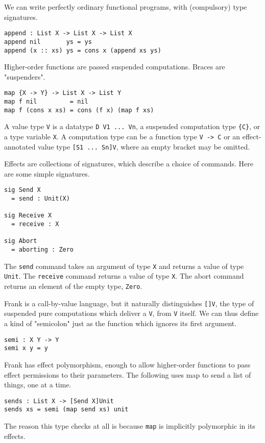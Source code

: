 \documentclass[preprint]{sigplanconf}
\begin{document}
We can write perfectly ordinary functional programs, with (compulsory)
type signatures.
%
\begin{verbatim}
append : List X -> List X -> List X
append nil       ys = ys
append (x :: xs) ys = cons x (append xs ys)
\end{verbatim}

Higher-order functions are passed suspended computations. Braces are
"suspenders".
%
\begin{verbatim}
map {X -> Y} -> List X -> List Y
map f nil         = nil
map f (cons x xs) = cons (f x) (map f xs)
\end{verbatim}

A value type \verb!V! is a datatype \verb!D V1 ... Vn!, a suspended
computation type \verb!{C}!, or a type variable \verb!X!.
%
A computation type can be a function type \verb!V -> C! or an
effect-annotated value type \verb![S1 ... Sn]V!, where an empty
bracket may be omitted.

Effects are collections of signatures, which describe a choice of
commands. Here are some simple signatures.
%
\begin{verbatim}
sig Send X
  = send : Unit(X)

sig Receive X
  = receive : X

sig Abort
  = aborting : Zero
\end{verbatim}
%
The \verb!send! command takes an argument of type \verb!X! and returns
a value of type \verb!Unit!. The \verb!receive! command returns a
value of type \verb!X!. The abort command returns an element of the
empty type, \verb!Zero!.

Frank is a call-by-value language, but it naturally distinguishes
\verb![]V!, the type of suspended pure computations which deliver a
\verb!V!, from \verb!V! itself. We can thus define a kind of
"semicolon" just as the function which ignores its first argument.
%
\begin{verbatim}
semi : X Y -> Y
semi x y = y
\end{verbatim}

Frank has effect polymorphism, enough to allow higher-order functions
to pass effect permissions to their parameters. The following uses map
to send a list of things, one at a time.
%
\begin{verbatim}
sends : List X -> [Send X]Unit
sends xs = semi (map send xs) unit
\end{verbatim}
%
The reason this type checks at all is because \verb!map! is implicitly
polymorphic in its effects.
\end{document}
